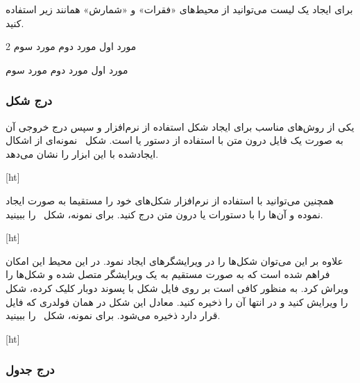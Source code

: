 برای ایجاد یک لیست‌ می‌توانید از محیط‌های «فقرات» و «شمارش» همانند زیر استفاده کنید.

\begin{multicols}{2}
 مورد اول
 مورد دوم
 مورد سوم

 مورد اول
 مورد دوم
 مورد سوم

\end{multicols}


\subsubsection{درج شکل}

یکی از روش‌های مناسب برای ایجاد شکل استفاده از نرم‌افزار  و سپس
درج خروجی آن به صورت یک فایل  درون متن 
با استفاده از دستور   یا  است.
شکل~ نمونه‌ای از اشکال ایجادشده با این ابزار را نشان می‌دهد.


[ht]

\bigskip
همچنین می‌توانید با استفاده از نرم‌افزار  شکل‌های خود را مستقیما به صورت  ایجاد نموده و آن‌ها را با دستورات  یا    درون متن درج کنید. برای نمونه، شکل~ را ببینید.


[ht]

علاوه بر این می‌توان شکل‌ها را در ویرایشگرهای   ایجاد نمود. در این محیط این امکان فراهم شده است که به صورت مستقیم به یک ویرایشگر  متصل شده و شکل‌ها را ویراش کرد. به منظور کافی است بر روی فایل شکل با پسوند  دوبار کلیک کرده، شکل را ویرایش کنید و در انتها آن را ذخیره کنید. معادل  این شکل در همان فولدری که فایل  قرار دارد ذخیره می‌شود.
 برای نمونه، شکل~ را ببینید.
 
[ht]



\subsubsection{درج جدول}

